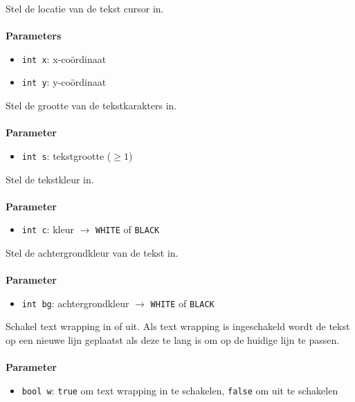 \documentclass[11pt,fleqn]{book} %
\begin{document}
\begin{libf}[setCursor(x, y)]
	Stel de locatie van de tekst cursor in.\\ \\
	\textbf{Parameters}
	\begin{itemize}
		\item \texttt{int x}: x-coördinaat
		\item \texttt{int y}: y-coördinaat
	\end{itemize}
\end{libf}

\begin{libf}[setTextSize(s)]
	Stel de grootte van de tekstkarakters in.\\ \\
	\textbf{Parameter}
	\begin{itemize}
		\item \texttt{int s}: tekstgrootte ($\geq 1$)
	\end{itemize}
\end{libf}

\begin{libf}[setTextColor(c)]
	Stel de tekstkleur in.\\ \\
	\textbf{Parameter}
	\begin{itemize}
		\item \texttt{int c}: kleur $\rightarrow$ \texttt{WHITE} of \texttt{BLACK}
	\end{itemize}
\end{libf}

\begin{libf}[setTextBackground(bg)]
	Stel de achtergrondkleur van de tekst in.\\ \\
	\textbf{Parameter}
	\begin{itemize}
		\item \texttt{int bg}: achtergrondkleur $\rightarrow$ \texttt{WHITE} of \texttt{BLACK}
	\end{itemize}
\end{libf}

\begin{libf}[setTextWrap(w)]
	Schakel text wrapping in of uit. Als text wrapping is ingeschakeld wordt de tekst op een nieuwe lijn geplaatst als deze te lang is om op de huidige lijn te passen.\\ \\
	\textbf{Parameter}
	\begin{itemize}
		\item \texttt{bool w}: \texttt{true} om text wrapping in te schakelen, \texttt{false} om uit te schakelen
	\end{itemize}
\end{libf}
\end{document}
